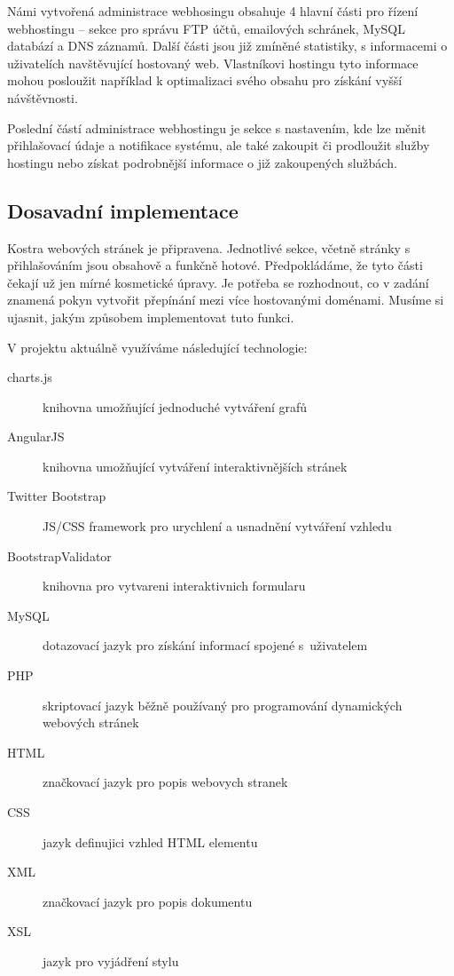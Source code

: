 \documentclass[11pt,a4paper]{article}
\begin{document}
    Námi vytvořená administrace webhosingu obsahuje 4 hlavní části pro řízení
    webhostingu -- sekce pro správu FTP účtů, emailových schránek, MySQL databází
    a DNS záznamů. Další části jsou již zmíněné statistiky, s informacemi o
    uživatelích navštěvující hostovaný web. Vlastníkovi hostingu tyto informace
    mohou posloužit například k optimalizaci svého obsahu pro získání vyšší návštěvnosti.

    Poslední částí administrace webhostingu je sekce s nastavením, kde lze měnit přihlašovací
    údaje a notifikace systému, ale také zakoupit či prodloužit služby hostingu
    nebo získat podrobnější informace o již zakoupených službách.

    \subsection{Dosavadní implementace}

    Kostra webových stránek je připravena. Jednotlivé sekce, včetně stránky s přihlašováním jsou
    obsahově a funkčně hotové. Předpokládáme, že tyto části čekají už jen mírné kosmetické
    úpravy. Je potřeba se rozhodnout, co v zadání znamená pokyn vytvořit přepínání mezi více hostovanými doménami. 
    Musíme si ujasnit, jakým způsobem implementovat tuto funkci.

    V projektu aktuálně využíváme následující technologie:
    \begin{description}
      \item[charts.js] knihovna umožňující jednoduché vytváření grafů
      \item[AngularJS] knihovna umožňující vytváření interaktivnějších stránek
      \item[Twitter Bootstrap] JS/CSS framework pro urychlení a usnadnění vytváření vzhledu
      \item[BootstrapValidator] knihovna pro vytvareni interaktivnich formularu
      \item[MySQL] dotazovací jazyk pro získání informací spojené s~uživatelem
      \item[PHP] skriptovací jazyk běžně používaný pro programování
                   dynamických webových stránek
      \item[HTML] značkovací jazyk pro popis webovych stranek
      \item[CSS] jazyk definujici vzhled HTML elementu
      \item[XML] značkovací jazyk pro popis dokumentu
      \item[XSL] jazyk pro vyjádření stylu
    \end{description}
\end{document}

